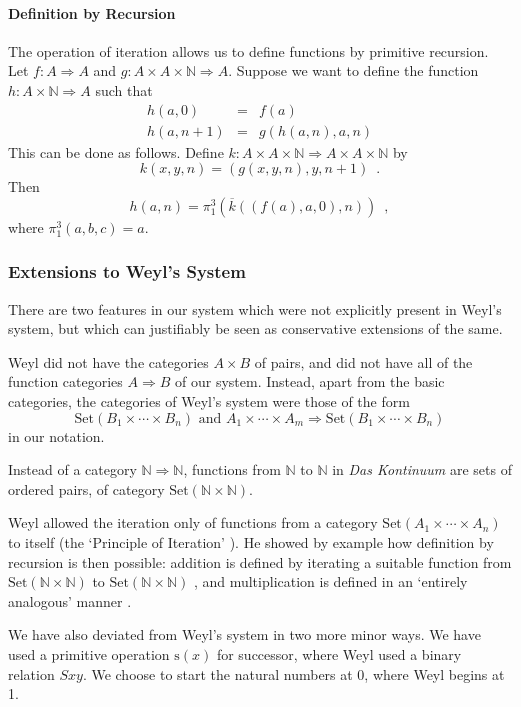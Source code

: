 \documentclass[acmtocl]{acmtrans2m}
\newcommand{\Set}[1]{\mathrm{Set} \left( {#1} \right)}
\newcommand{\s}{\mathrm{s}}
\newcommand{\boldarrow}{\Rightarrow}
\begin{document}
\paragraph{Definition by Recursion}
The operation of iteration allows us to define functions by primitive recursion.  Let $f : A \boldarrow A$ and $g : A \times A \times \mathbb{N} \boldarrow A$.  Suppose we want to define the function $h : A \times \mathbb{N} \boldarrow A$ such that
\begin{eqnarray*}
 h(a,0) & = & f(a) \\
h(a,n+1) & = & g(h(a,n),a,n)
\end{eqnarray*}
This can be done as follows.  Define $k : A \times A \times \mathbb{N} \boldarrow A \times A \times \mathbb{N}$ by
\[ k(x,y,n) = (g(x,y,n),y,n+1) \enspace . \]
Then
\[ h(a,n) = \pi_1^3(\overline{k}((f(a),a,0),n)) \enspace , \]
where $\pi_1^3(a,b,c) = a$.


\subsubsection{Extensions to Weyl's System}
\label{section:extension}
There are two features in our system which were not
explicitly present in Weyl's system, but which can justifiably be
seen as conservative extensions of the same.

Weyl did not have the categories $A \times B$ of pairs, and did not have all of the function categories $A \boldarrow B$ of our system.  Instead, apart from the basic categories, the categories of Weyl's system were those of the form
\[ \Set{B_1 \times \cdots \times B_n} \mbox{ and } A_1 \times \cdots \times A_m \boldarrow \Set{B_1 \times \cdots \times B_n} \]
in our notation.

Instead of a category $\mathbb{N} \boldarrow \mathbb{N}$, functions from $\mathbb{N}$ to $\mathbb{N}$ in \emph{Das Kontinuum} are sets of ordered pairs, of category $\Set{\mathbb{N} \times \mathbb{N}}$.

Weyl allowed the iteration only of functions from a category $\Set{A_1 \times \cdots \times A_n}$ to itself (the `Principle of Iteration' \cite[p.~36]{weyl:continuum}).  He showed by example how definition by recursion is then possible: addition is defined by iterating a suitable function from $\Set{\mathbb{N} \times \mathbb{N}}$ to $\Set{\mathbb{N} \times \mathbb{N}}$ \cite[p.~51]{weyl:continuum}, and multiplication is defined in an `entirely analogous' manner \cite[p.~53]{weyl:continuum}.

We have also deviated from Weyl's system in two more minor ways.  We have used a primitive operation $\s(x)$ for successor, where Weyl used a binary relation $Sxy$.
We choose to start the natural numbers at 0, where Weyl begins at 1.
\end{document}
